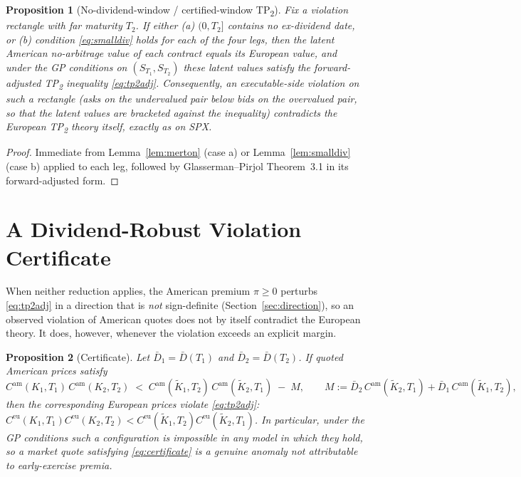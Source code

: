 \documentclass[11pt]{article}
\newtheorem{proposition}{Proposition}
\theoremstyle{remark}
\newcommand{\Cam}{C^{\mathrm{am}}}
\newcommand{\Ceu}{C^{\mathrm{eu}}}
\newcommand{\Kt}[1]{\tilde K_{#1}}
\begin{document}
\begin{proposition}[No-dividend-window / certified-window TP\textsubscript{2}]\label{prop:window}
Fix a violation rectangle with far maturity $T_2$. If either (a) $(0,T_2]$ contains no ex-dividend date, or (b) condition \eqref{eq:smalldiv} holds for each of the four legs, then the latent American no-arbitrage value of each contract equals its European value, and under the GP conditions on $(S_{T_1},S_{T_2})$ these latent values satisfy the forward-adjusted TP\textsubscript{2} inequality \eqref{eq:tp2adj}. Consequently, an executable-side violation on such a rectangle (asks on the undervalued pair below bids on the overvalued pair, so that the latent values are bracketed against the inequality) contradicts the \emph{European} TP\textsubscript{2} theory itself, exactly as on SPX.
\end{proposition}

\begin{proof}
Immediate from Lemma~\ref{lem:merton} (case a) or Lemma~\ref{lem:smalldiv} (case b) applied to each leg, followed by Glasserman--Pirjol Theorem~3.1 in its forward-adjusted form.
\end{proof}

\section{A Dividend-Robust Violation Certificate}

When neither reduction applies, the American premium $\pi\ge0$ perturbs \eqref{eq:tp2adj} in a direction that is \emph{not} sign-definite (Section~\ref{sec:direction}), so an observed violation of American quotes does not by itself contradict the European theory. It does, however, whenever the violation exceeds an explicit margin.

\begin{proposition}[Certificate]\label{prop:certificate}
Let $\bar D_1=\bar D(T_1)$ and $\bar D_2=\bar D(T_2)$. If quoted American prices satisfy
\begin{equation}
\Cam(K_1,T_1)\,\Cam(K_2,T_2)\;<\;\Cam(\Kt1,T_2)\,\Cam(\Kt2,T_1)\;-\;M,
\qquad
M:=\bar D_2\,\Cam(\Kt2,T_1)+\bar D_1\,\Cam(\Kt1,T_2),
\label{eq:certificate}
\end{equation}
then the corresponding European prices violate \eqref{eq:tp2adj}: $\Ceu(K_1,T_1)\Ceu(K_2,T_2)<\Ceu(\Kt1,T_2)\Ceu(\Kt2,T_1)$. In particular, under the GP conditions such a configuration is impossible in any model in which they hold, so a market quote satisfying \eqref{eq:certificate} is a genuine anomaly not attributable to early-exercise premia.
\end{proposition}
\end{document}
